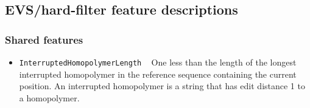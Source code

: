 \documentclass{article}
\begin{document}
\subsection{EVS/hard-filter feature descriptions}

\subsubsection{Shared features}
\begin{itemize}

    \item \texttt{InterruptedHomopolymerLength} ~ One less than the length of the longest interrupted homopolymer in the reference sequence containing the current position. An interrupted homopolymer is a string that has edit distance 1 to a homopolymer.

\end{itemize}
\end{document}
